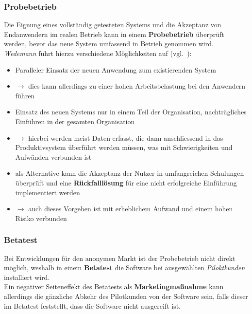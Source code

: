 \subsubsection*{Probebetrieb}
Die Eignung eines vollständig getesteten Systems und die Akzeptanz von Endanwendern im realen Betrieb kann in einem \textbf{Probebetrieb} überprüft werden, bevor das neue System umfassend in Betrieb genommen wird.\\
\textit{Wedemann} führt hierzu verschiedene Möglichkeiten auf (vgl.~\cite[65]{Wed09c}):

\begin{itemize}
    \item Paralleler Einsatz der neuen Anwendung zum existierenden System
    \item[]$\rightarrow$ dies kann allerdings zu einer hohen Arbeitsbelastung bei den Anwendern führen
    \item Einsatz des neuen Systems nur in einem Teil der Organisation, nachträgliches Einführen in der gesamten Organisation
    \item[] $\rightarrow$ hierbei werden meist Daten erfasst, die dann anschliessend in das Produktivsystem überführt werden müssen, was mit Schwierigkeiten und Aufwänden verbunden ist
    \item als Alternative kann die Akzeptanz der Nutzer in umfangreichen Schulungen überprüft und eine \textbf{Rückfalllösung} für eine nicht erfolgreiche Einführung implementiert werden
    \item[]$\rightarrow$ auch dieses Vorgehen ist mit erheblichem Aufwand und einem hohen Risiko verbunden
\end{itemize}

\subsubsection*{Betatest}
Bei Entwicklungen für den anonymen Markt ist der Probebetrieb nicht direkt möglich, weshalb in einem \textbf{Betatest} die Software bei ausgewählten \textit{Piloktkunden} installiert wird.\\
Ein negativer Seiteneffekt des Betatests als \textbf{Marketingmaßnahme} kann allerdings die gänzliche Abkehr des Pilotkunden von der Software sein, falls dieser im Betatest feststellt, dass die Software nicht ausgereift ist.
